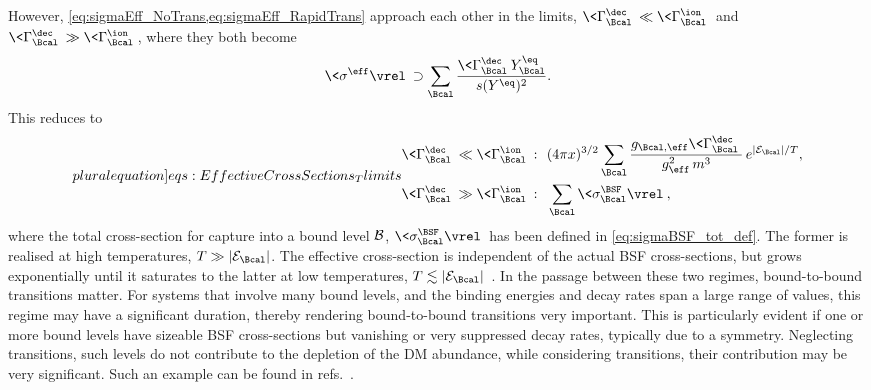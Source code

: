 \documentclass[preprint,5p,twocolumn]{elsarticle}
\begin{document}
However, \cref{eq:sigmaEff_NoTrans,eq:sigmaEff_RapidTrans} approach each other in the limits,
$\<\Gamma_{\Bcal}^{\dec}\> \ll \<\Gamma_{\Bcal}^{\ion}\>$ and 
$\<\Gamma_{\Bcal}^{\dec}\> \gg \<\Gamma_{\Bcal}^{\ion}\>$, where they both become
%
\begin{align}
\<\sigma^{\eff} \vrel\> \supset 
\sum_{\Bcal} \dfrac{\<\Gamma_{\Bcal}^{\dec}\> Y_{\Bcal}^{\eq}}{s(Y^{\eq})^2} .
\label{eq:EffectiveCrossSections_limits}
\end{align}
%
This reduces to
%
\begin{subequations}
\label{eq:EffectiveCrossSections_Tlimits}
\label[pluralequation]{eqs:EffectiveCrossSections_Tlimits}
\begin{align}
\<\Gamma_{\Bcal}^{\dec}\> \ll \<\Gamma_{\Bcal}^{\ion}\>:&~~
(4\pi x)^{3/2}
\sum_{\Bcal} \dfrac{g_{\Bcal,\eff} \<\Gamma_{\Bcal}^{\dec}\>}{g_{\eff}^2 \, m^3}
\, e^{|{\cal E}_{\Bcal}|/T} ,
\label{eq:EffectiveCrossSections_Tlarge}
\\
\<\Gamma_{\Bcal}^{\dec}\> \gg \<\Gamma_{\Bcal}^{\ion}\>:&~~
\sum_{\Bcal} \<\sigma_{\Bcal}^{\BSF} \vrel\> ,
\label{eq:EffectiveCrossSections_Tlow}
\end{align}
\end{subequations}
%
where the total cross-section for capture into a bound level ${\cal B}$, $\<\sigma_{\Bcal}^{\BSF} \vrel\>$ has been defined in \cref{eq:sigmaBSF_tot_def}.
The former is realised at high temperatures, $T \gg |{\cal E}_{\Bcal}|$. The effective cross-section is independent of the actual BSF cross-sections, but grows exponentially until it saturates to the latter at low temperatures, $T \lesssim |{\cal E}_{\Bcal}|$~\cite{Binder:2018znk}. In the passage between these two regimes, bound-to-bound transitions matter. For systems that involve many bound levels, and the binding energies and decay rates span a large range of values, this regime may have a significant duration, thereby rendering bound-to-bound transitions very important. This is particularly evident if one or more bound levels have sizeable BSF cross-sections but vanishing or very suppressed decay rates, typically due to a symmetry. Neglecting transitions, such levels do not contribute to the depletion of the DM abundance, while considering transitions, their contribution may be very significant. Such an example can be found in refs.~\cite{Oncala:2021swy,Oncala:2021tkz}.
\end{document}
